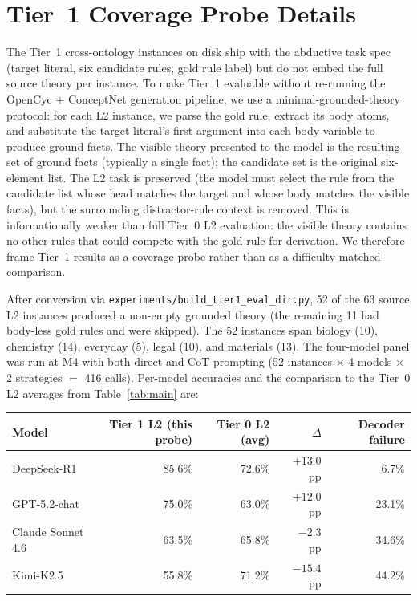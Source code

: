 \documentclass{article}
\theoremstyle{definition}
\begin{document}
\section{Tier~1 Coverage Probe Details}\label{app:tier1}

The Tier~1 cross-ontology instances on disk ship with the abductive task spec (target literal, six candidate rules, gold rule label) but do not embed the full source theory per instance. To make Tier~1 evaluable without re-running the OpenCyc + ConceptNet generation pipeline, we use a minimal-grounded-theory protocol: for each L2 instance, we parse the gold rule, extract its body atoms, and substitute the target literal's first argument into each body variable to produce ground facts. The visible theory presented to the model is the resulting set of ground facts (typically a single fact); the candidate set is the original six-element list. The L2 task is preserved (the model must select the rule from the candidate list whose head matches the target and whose body matches the visible facts), but the surrounding distractor-rule context is removed. This is informationally weaker than full Tier~0 L2 evaluation: the visible theory contains no other rules that could compete with the gold rule for derivation. We therefore frame Tier~1 results as a coverage probe rather than as a difficulty-matched comparison.

After conversion via \texttt{experiments/build\_tier1\_eval\_dir.py}, 52 of the 63 source L2 instances produced a non-empty grounded theory (the remaining 11 had body-less gold rules and were skipped). The 52 instances span biology (10), chemistry (14), everyday (5), legal (10), and materials (13). The four-model panel was run at M4 with both direct and CoT prompting (52 instances $\times$ 4 models $\times$ 2 strategies $=$ 416 calls). Per-model accuracies and the comparison to the Tier~0 L2 averages from Table~\ref{tab:main} are:

\begin{table}[h]
\centering
\small
\begin{tabular}{lrrrr}
\toprule
Model & Tier 1 L2 (this probe) & Tier 0 L2 (avg) & $\Delta$ & Decoder failure \\
\midrule
DeepSeek-R1         & 85.6\% & 72.6\% & $+13.0$~pp & \phantom{0}6.7\% \\
GPT-5.2-chat        & 75.0\% & 63.0\% & $+12.0$~pp & 23.1\% \\
Claude Sonnet 4.6   & 63.5\% & 65.8\% & $-2.3$~pp  & 34.6\% \\
Kimi-K2.5           & 55.8\% & 71.2\% & $-15.4$~pp & 44.2\% \\
\bottomrule
\end{tabular}
\end{table}
\end{document}
